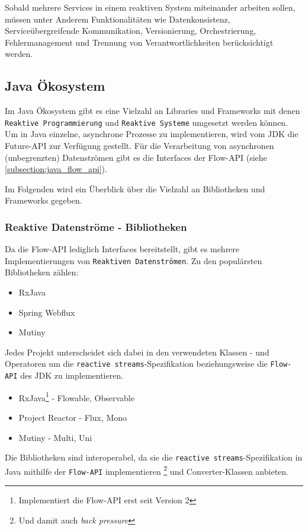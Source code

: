 Sobald mehrere Services in einem reaktiven System miteinander arbeiten sollen, müssen unter Anderem Funktionalitäten wie
Datenkonsistenz, Serviceübergreifende Kommunikation, Versionierung, Orchestrierung, Fehlermanagement und Trennung von Verantwortlichkeiten
berücksichtigt werden.

\subsection{Java Ökosystem}
\label{subsec:java_ökosystem}
Im Java Ökosystem gibt es eine Vielzahl an Libraries und Frameworks mit denen
\verb|Reaktive Programmierung| und \verb|Reaktive Systeme| umgesetzt werden können.
Um in Java einzelne, asynchrone Prozesse zu implementieren, wird vom JDK die Future-API zur Verfügung gestellt.\parencite{OracleFuture}
Für die Verarbeitung von asynchronen (unbegrenzten) Datenströmen gibt es die Interfaces der Flow-API (siehe \ref{subsection:java_flow_api}).
\parencite{OracleFlow}

Im Folgenden wird ein Überblick über die Vielzahl an Bibliotheken und Frameworks gegeben.

\subsubsection{Reaktive Datenströme - Bibliotheken}
\label{subsubsec:reactive_streams}
Da die Flow-API lediglich Interfaces bereitstellt, gibt es mehrere Implementierungen von \verb|Reaktiven Datenströmen|.
Zu den populärsten Bibliotheken zählen:
\begin{itemize}
    \item RxJava
    \item Spring Webflux
    \item Mutiny
\end{itemize}
Jedes Projekt unterscheidet sich dabei in den verwendeten Klassen - und Operatoren um die \verb|reactive streams|-Spezifikation
beziehungsweise die \verb|Flow-API| des JDK zu implementieren.
\begin{itemize}
    \item RxJava\footnote{Implementiert die Flow-API erst seit Version 2} - Flowable, Observable \parencite{RxJava}
    \item Project Reactor - Flux, Mono \parencite{ProjectReactor}
    \item Mutiny - Multi, Uni \parencite{Mutiny}
\end{itemize}

Die Bibliotheken sind interoperabel, da sie die \verb|reactive streams|-Spezifikation in Java mithilfe der \verb|Flow-API|
implementieren \footnote{Und damit auch \textit{back pressure}} und Converter-Klassen anbieten.

